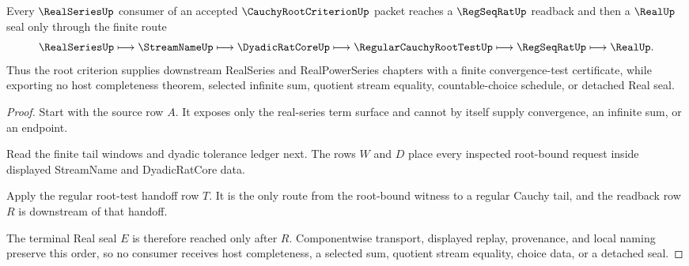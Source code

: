 \begin{theorem}
\label{thm:cauchy-root-criterion-real-series-handoff}
Every $\RealSeriesUp$ consumer of an accepted $\CauchyRootCriterionUp$ packet reaches a $\RegSeqRatUp$ readback and then a $\RealUp$ seal only through the finite route
$$
\RealSeriesUp \longmapsto \StreamNameUp \longmapsto \DyadicRatCoreUp \longmapsto \RegularCauchyRootTestUp \longmapsto \RegSeqRatUp \longmapsto \RealUp .
$$
Thus the root criterion supplies downstream RealSeries and RealPowerSeries chapters with a finite convergence-test certificate, while exporting no host completeness theorem, selected infinite sum, quotient stream equality, countable-choice schedule, or detached Real seal.
\end{theorem}
\begin{proof}
Start with the source row $A$. It exposes only the real-series term surface and cannot by itself supply convergence, an infinite sum, or an endpoint.

Read the finite tail windows and dyadic tolerance ledger next. The rows $W$ and $D$ place every inspected root-bound request inside displayed StreamName and DyadicRatCore data.

Apply the regular root-test handoff row $T$. It is the only route from the root-bound witness to a regular Cauchy tail, and the readback row $R$ is downstream of that handoff.

The terminal Real seal $E$ is therefore reached only after $R$. Componentwise transport, displayed replay, provenance, and local naming preserve this order, so no consumer receives host completeness, a selected sum, quotient stream equality, choice data, or a detached seal.
\end{proof}



